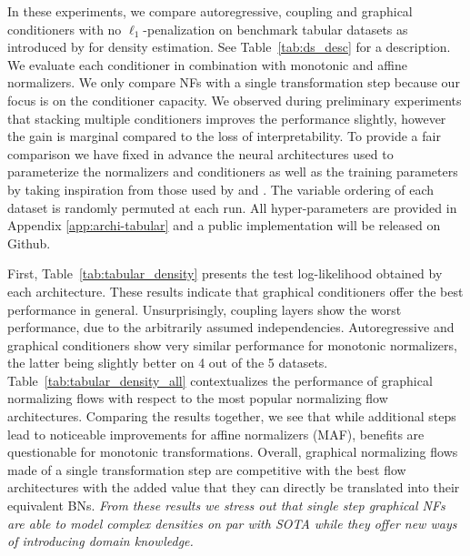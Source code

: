 \documentclass[twoside]{article}
\newcommand{\Cref}[1]{Table~\ref{#1}}
\begin{document}
In these experiments, we compare autoregressive, coupling and graphical conditioners with no $\ell_1$-penalization on benchmark tabular datasets as introduced by \cite{MAF} for density estimation. See \Cref{tab:ds_desc} for a description. We evaluate each conditioner in combination with monotonic and affine normalizers.
We only compare NFs with a single transformation step because our focus is on the conditioner capacity. We observed during preliminary experiments that stacking multiple conditioners  improves the performance slightly, however the gain is marginal compared to the loss of interpretability. To provide a fair comparison we have fixed in advance the neural architectures used to parameterize the normalizers and conditioners as well as the training parameters by taking inspiration from those used by \citet{UMNN} and \citet{MAF}. The variable ordering of each dataset is randomly permuted at each run. All hyper-parameters are provided in Appendix \ref{app:archi-tabular} and a public implementation will be released on Github.

First, \Cref{tab:tabular_density} presents the test log-likelihood obtained by each architecture. These results indicate that graphical conditioners offer the best performance in general. Unsurprisingly, coupling layers show the worst performance, due to the arbitrarily assumed independencies. Autoregressive and graphical conditioners show very similar performance for monotonic normalizers, the latter being slightly better on 4 out of the 5 datasets. \Cref{tab:tabular_density_all} contextualizes the performance of graphical normalizing flows with respect to the most popular normalizing flow architectures.
Comparing the results together, we see that while additional steps lead to noticeable improvements for affine normalizers (MAF), benefits are questionable for monotonic transformations. Overall, graphical normalizing flows made of a single transformation step are competitive with the best flow architectures with the added value that they can directly be translated into their equivalent BNs. \emph{From these results we stress out that single step graphical NFs are able to model complex densities on par with SOTA while they offer new ways of introducing domain knowledge.}
\end{document}
